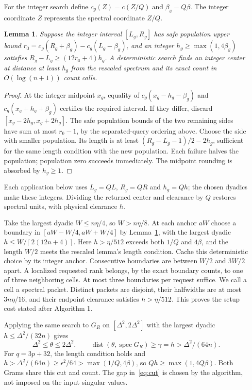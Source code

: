 \documentclass[11pt]{article}
\newtheorem{lemma}[theorem]{Lemma}
\theoremstyle{remark}\newtheorem{remark}[theorem]{Remark}
\newcommand{\spec}{\operatorname{spec}}
\begin{document}
For the integer search define $c_g(Z)=c(Z/Q)$ and $\beta_g=Q\beta$.
The integer coordinate $Z$ represents the spectral coordinate $Z/Q$.
\begin{lemma}\label{lem:gap}
Suppose the integer interval $[L_g,R_g]$ has safe population upper bound
$r_0=c_g(R_g+\beta_g)-c_g(L_g-\beta_g)$, and an integer
$h_g\ge\max(1,4\beta_g)$ satisfies $R_g-L_g\ge(12r_0+4)h_g$.
A deterministic search finds an integer center at distance at least $h_g$
from the rescaled spectrum and its exact count in $O(\log(n+1))$ count calls.
\end{lemma}
\begin{proof}
At the integer midpoint $x_g$, equality of $c_g(x_g-h_g-\beta_g)$ and
$c_g(x_g+h_g+\beta_g)$ certifies the required interval. If they differ,
discard $[x_g-2h_g,x_g+2h_g]$. The safe population bounds of the two remaining
sides have sum at most $r_0-1$, by the separated-query ordering above.
Choose the side with smaller population. Its length is at least
$(R_g-L_g-1)/2-2h_g$, sufficient for the same length condition with the new
population. Each failure halves the population; population zero succeeds
immediately. The midpoint rounding is absorbed by $h_g\ge1$.
\end{proof}
Each application below uses $L_g=QL$, $R_g=QR$ and $h_g=Qh$; the chosen
dyadics make these integers. Dividing the returned center and clearance by
$Q$ restores spectral units, with physical clearance $h$.

Take the largest dyadic $W\le n\eta/4$, so $W>n\eta/8$. At each anchor
$aW$ choose a boundary in $[aW-W/4,aW+W/4]$ by Lemma~\ref{lem:gap},
with the largest dyadic $h\le W/[2(12n+4)]$. Here $h>\eta/512$
exceeds both $1/Q$ and $4\beta$, and the length $W/2$ meets the
rescaled lemma's length condition. Cache this deterministic choice
by its integer anchor. Consecutive boundaries are between $W/2$ and $3W/2$
apart. A localized requested rank belongs, by the exact boundary counts, to
one of three neighboring cells. At most three boundaries per request suffice.
We call a cell a spectral packet. Distinct packets are disjoint, their
halfwidths are at most $3n\eta/16$, and their endpoint clearance satisfies
$h>\eta/512$. This proves the setup cost stated after Algorithm 1.

Applying the same search to $G_R$ on $[\Delta^2,2\Delta^2]$ with the largest
dyadic $h\le\Delta^2/(32n)$ gives
\begin{equation}\label{eq:cut}
 \Delta^2\le\theta\le2\Delta^2,\qquad
 \operatorname{dist}(\theta,\spec G_R)\ge\gamma=h>\Delta^2/(64n).
\end{equation}
For $q=3p+32$, the length condition holds and
$h>\Delta^2/(64n)\ge\epsilon^2/64>\max(1/Q,4\beta)$,
so $Qh\ge\max(1,4Q\beta)$. Both Grams share
this cut and count. The gap in~\eqref{eq:cut} is chosen by the algorithm,
not imposed on the input singular values.
\end{document}
